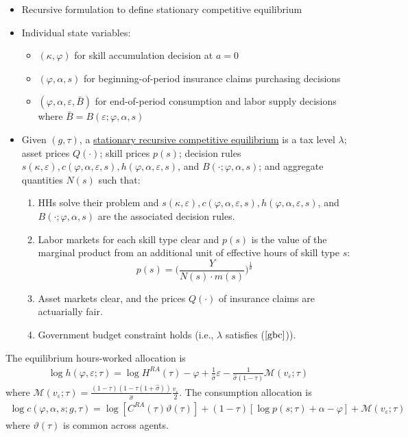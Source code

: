 \documentclass{article}
\newcommand{\M}{\mathcal{M}}
\begin{document}
\begin{itemize}
\item Recursive formulation to define stationary competitive equilibrium
\item Individual state variables:
\begin{itemize}
\item $(\kappa, \varphi)$ for skill accumulation decision at $a = 0$
\item $(\varphi, \alpha, s)$ for beginning-of-period insurance claims purchasing decisions
\item $(\varphi, \alpha, \varepsilon, \bar B)$ for end-of-period consumption and labor supply decisions where $\bar B = B(\varepsilon; \varphi, \alpha, s)$
\end{itemize}
\item Given $(g, \tau)$, a \underline{stationary recursive competitive equilibrium} is a tax level $\lambda$; asset prices $Q(\cdot)$; skill prices $p(s)$; decision rules $s(\kappa, \varepsilon), c(\varphi, \alpha, \varepsilon, s), h(\varphi, \alpha, \varepsilon, s)$, and $B(\cdot; \varphi, \alpha, s)$; and aggregate quantities $N(s)$ such that:
\begin{enumerate}
\item HHs solve their problem and $s(\kappa, \varepsilon), c(\varphi, \alpha, \varepsilon, s), h(\varphi, \alpha, \varepsilon, s)$, and $B(\cdot; \varphi, \alpha, s)$ are the associated decision rules.
\item Labor markets for each skill type clear and $p(s)$ is the value of the marginal product from an additional unit of effective hours of skill type $s$:
$$
p(s) = \Bigg( \frac{Y}{N(s)\cdot m(s)} \Bigg)^{\frac{1}{\theta}}
$$
\item Asset markets clear, and the prices $Q(\cdot)$ of insurance claims are actuarially fair.
\item Government budget constraint holds (i.e., $\lambda$ satisfies ($\ref{gbc}$)).
\end{enumerate}
\end{itemize}



{
\proposition The equilibrium hours-worked allocation is
\begin{align}
\log h(\varphi, \varepsilon; \tau) = \log H^{RA}(\tau) - \varphi + \frac{1}{\hat{\sigma}} \varepsilon - \frac{1}{\hat \sigma (1- \tau)} \M (v_\varepsilon; \tau)
\end{align}
where $\M ( v_\varepsilon; \tau) = \frac{(1-\tau)(1 - \tau(1+\hat \sigma))}{\hat \sigma} \frac{v_\varepsilon}{2}$. The consumption allocation is 
\begin{align}
\log c(\varphi, \alpha, s; g, \tau) = \log [C^{RA}(\tau)\vartheta(\tau)] + (1 - \tau) [\log p(s; \tau) + \alpha - \varphi] + \M (v_\varepsilon; \tau)
\end{align}
where $\vartheta(\tau)$ is common across agents.
}
\end{document}
